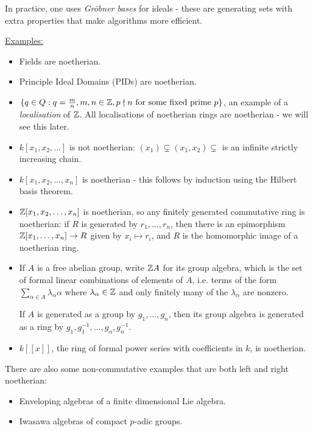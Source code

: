 \documentclass[10pt,a4paper]{article}
\begin{document}
In practice, one uses \emph{Gr\"obner bases} for ideals - these are generating sets with extra properties that make algorithms more efficient.

\underline{Examples:}
\begin{itemize}
  \item Fields are noetherian.
  \item Principle Ideal Domains (PIDs) are noetherian.
  \item $\{q \in Q : q = \frac{m}{n}, m, n \in \mathbb{Z}, p \nmid n \text{ for some fixed prime } p\}$, an example of a \textit{localisation} of $\mathbb{Z}$. All localisations of noetherian rings are noetherian - we will see this later.
  \item $k[x_1, x_2, \ldots]$ is not noetherian: $(x_1) \subsetneq (x_1, x_2) \subsetneq$ is an infinite strictly increasing chain.
  \item $k[x_1, x_2, \ldots, x_n]$ is noetherian - this follows by induction using the Hilbert basis theorem.
  \item $\mathbb{Z}[x_1, x_2, \ldots, x_n]$ is noetherian, so any finitely generated commutative ring is noetherian: if $R$ is generated by $r_1, \ldots, r_n$, then there is an epimorphism $\mathbb{Z}[x_1, \ldots, x_n] \to R$ given by $x_i \mapsto r_i$, and $R$ is the homomorphic image of a noetherian ring.
  \item If $A$ is a free abelian group, write $\mathbb{Z} A$ for its group algebra, which is the set of formal linear combinations of elements of $A$, i.e. terms of the form $\sum_{\alpha \in A} \lambda_\alpha \alpha$ where $\lambda_\alpha \in \mathbb{Z}$ and only finitely many of the $\lambda_\alpha$ are nonzero.

  If $A$ is generated as a group by $g_1, \ldots, g_n$, then its group algebra is generated as a ring by $g_1, g_1^{-1}, \ldots, g_n, g_n^{-1}$.
  \item $k[[x]]$, the ring of formal power series with coefficients in $k$, is noetherian.
\end{itemize}
There are also some non-commutative examples that are both left and right noetherian:
\begin{itemize}
  \item Enveloping algebras of a finite dimensional Lie algebra.
  \item Iwasawa algebras of compact $p$-adic groups.
\end{itemize}
\end{document}

